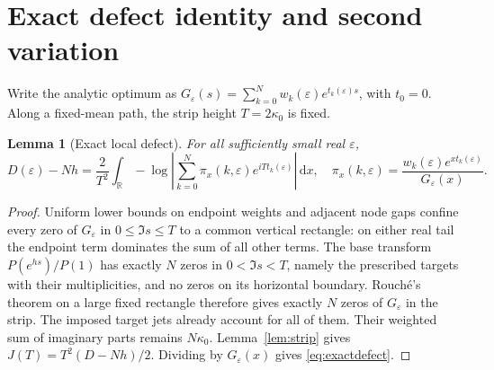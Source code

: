 \documentclass[11pt]{article}
\newtheorem{lemma}[theorem]{Lemma}
\theoremstyle{remark}\newtheorem{remark}[theorem]{Remark}
\newcommand{\R}{\mathbb R}\newcommand{\C}{\mathbb C}
\newcommand{\dd}{\,\mathrm d}
\begin{document}
\section{Exact defect identity and second variation}

Write the analytic optimum as $G_\varepsilon(s)=\sum_{k=0}^Nw_k(\varepsilon)e^{t_k(\varepsilon)s}$, with $t_0=0$. Along a fixed-mean path, the strip height $T=2\kappa_0$ is fixed.

\begin{lemma}[Exact local defect]\label{lem:defect}
For all sufficiently small real $\varepsilon$,
\begin{equation}\label{eq:exactdefect}
 D(\varepsilon)-Nh
 =\frac{2}{T^2}\int_\R
 -\log\left|\sum_{k=0}^N\pi_x(k,\varepsilon)e^{iTt_k(\varepsilon)}\right|\dd x,
 \quad
 \pi_x(k,\varepsilon)=\frac{w_k(\varepsilon)e^{xt_k(\varepsilon)}}{G_\varepsilon(x)}.
\end{equation}
\end{lemma}
\begin{proof}
Uniform lower bounds on endpoint weights and adjacent node gaps confine every zero of $G_\varepsilon$ in $0\le\Im s\le T$ to a common vertical rectangle: on either real tail the endpoint term dominates the sum of all other terms. The base transform $P(e^{hs})/P(1)$ has exactly $N$ zeros in $0<\Im s<T$, namely the prescribed targets with their multiplicities, and no zeros on its horizontal boundary. Rouch\'e's theorem on a large fixed rectangle therefore gives exactly $N$ zeros of $G_\varepsilon$ in the strip. The imposed target jets already account for all of them. Their weighted sum of imaginary parts remains $N\kappa_0$. Lemma~\ref{lem:strip} gives $J(T)=T^2(D-Nh)/2$. Dividing by $G_\varepsilon(x)$ gives \eqref{eq:exactdefect}.
\end{proof}
\end{document}
